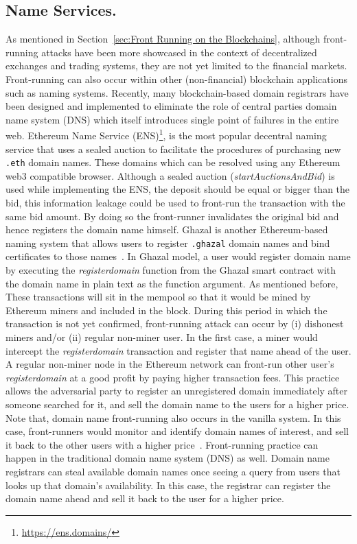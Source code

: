 \subsection{Name Services.}
\noindent As mentioned in Section~\ref{sec:Front Running on the Blockchains}, although front-running attacks have been more showcased in the context of decentralized exchanges and trading systems, they are not yet limited to the financial markets. Front-running can also occur within other (non-financial) blockchain applications such as naming systems. Recently, many blockchain-based domain registrars have been designed and implemented to eliminate the role of central parties \ie domain name system (DNS) which itself introduces single point of failures in the entire web. Ethereum Name Service (ENS)\footnote{\url{https://ens.domains/}}, is the most popular decentral naming service that uses a sealed auction to facilitate the procedures of purchasing new \texttt{.eth} domain names. These domains which can be resolved using any Ethereum web3 compatible browser. Although a sealed auction (\textit{startAuctionsAndBid}) is used while implementing the ENS, the deposit should be equal or bigger than the bid, this information leakage could be used to front-run the transaction with the same bid amount. By doing so the front-runner invalidates the original bid and hence registers the domain name himself. Ghazal is another Ethereum-based naming system that allows users to register \texttt{.ghazal} domain names and bind certificates to those names~\cite{moosavighazal}.  In Ghazal model, a user would register domain name by executing the \textit{registerdomain} function from the Ghazal smart contract with the domain name in plain text as the function argument. As mentioned before, These transactions will sit in the mempool so that it would be mined by Ethereum miners and included in the block. During this period in which the transaction is not yet confirmed, front-running attack can occur by (i) dishonest miners and/or (ii) regular non-miner user. In the first case, a miner would intercept the \textit{registerdomain} transaction and register that name ahead of the user. A regular non-miner node in the Ethereum network can front-run other user's \textit{registerdomain} at a good profit by paying higher transaction fees. This practice allows the adversarial party  to register an unregistered domain immediately after someone searched for it, and sell the domain name to the users for a higher price. Note that, domain name front-running also occurs in the vanilla system. In this case, front-runners would monitor and identify domain names of interest, and sell it back to the other users with a higher price~\cite{sac022en33:online}. Front-running practice can happen in the traditional domain name system (DNS) as well. Domain name registrars can steal available domain names once seeing a query from users that looks up that domain's availability. In this case, the registrar can register the domain name ahead and sell it back to the user for a higher price.

